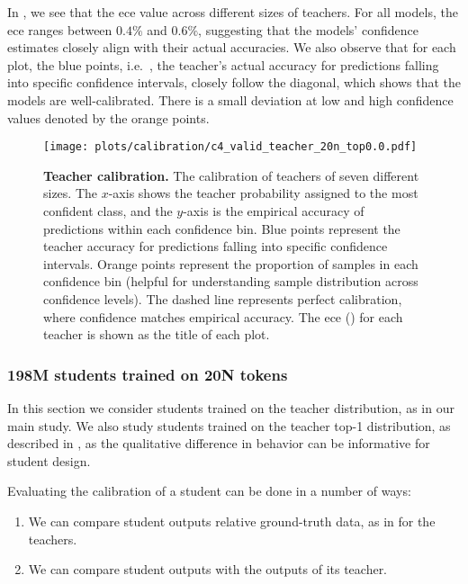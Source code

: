 In , we see that the \gls{ece} value across different sizes of teachers. For all models, the \gls{ece} ranges between $0.4\%$ and $0.6\%$, suggesting that the models’ confidence estimates closely align with their actual accuracies. We also observe that for each plot, the blue points, i.e.~, the teacher's actual accuracy for predictions falling into specific confidence intervals, closely follow the diagonal, which shows that the models are well-calibrated. There is a small deviation at low and high confidence values denoted by the orange points.

\begin{figure}[h]
	\centering
	\texttt{[image: plots/calibration/c4\_valid\_teacher\_20n\_top0.0.pdf]}
	\caption{\textbf{Teacher calibration.} The calibration of teachers of seven different sizes. The $x$-axis shows the teacher probability assigned to the most confident class, and the $y$-axis is the empirical accuracy of predictions within each confidence bin. Blue points represent the teacher accuracy for predictions falling into specific confidence intervals. Orange points represent the proportion of samples in each confidence bin (helpful for understanding sample distribution across confidence levels). The dashed line represents perfect calibration, where confidence matches empirical accuracy. The \gls{ece} () for each teacher is shown as the title of each plot.}
	\label{fig:calibration-teacher}
\end{figure}

\FloatBarrier
\subsubsection{198M students trained on 20N tokens}
\label{sssec:198m-students-trained-on-20n-tokens}

In this section we consider students trained on the teacher distribution, as in our main study.
We also study students trained on the teacher top-1 distribution, as described in ,
as the qualitative difference in behavior can be informative for student design.

Evaluating the calibration of a student can be done in a number of ways:
\begin{enumerate}
    \item We can compare student outputs relative ground-truth data, as in  for the teachers.
    \item We can compare student outputs with the outputs of its teacher.
\end{enumerate}

